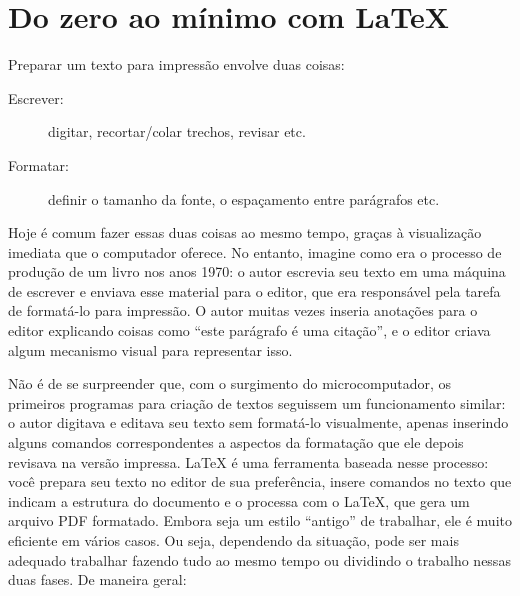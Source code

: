 
\newcommand{\sla}{\textbackslash}

\newcommand{\cmd}[1]{\textsf{#1}}

\newcommand{\pkg}[1]{\textsf{#1}}

\newcommand{\ltxcmd}[1]{\cmd{\sla{}#1}}

\chapter{Do zero ao mínimo com \LaTeX{}}
\label{chap:tutorial}

Preparar um texto para impressão envolve duas coisas:

\begin{description}
\item[Escrever:] digitar, recortar/colar trechos, revisar etc.
\item[Formatar:] definir o tamanho da fonte, o
espaçamento entre parágrafos etc.
\end{description}

Hoje é comum fazer essas duas coisas ao mesmo tempo, graças à visualização
imediata que o computador oferece. No entanto, imagine como era o processo de
produção de um livro nos anos 1970: o autor escrevia seu texto em uma máquina
de escrever e enviava esse material para o editor, que era responsável pela
tarefa de formatá-lo para impressão. O autor muitas vezes inseria anotações
para o editor explicando coisas como ``este parágrafo é uma citação'', e o
editor criava algum mecanismo visual para representar isso.

Não é de se surpreender que, com o surgimento do microcomputador, os primeiros
programas para criação de textos seguissem um funcionamento similar: o autor
digitava e editava seu texto sem formatá-lo visualmente, apenas inserindo
alguns comandos correspondentes a aspectos da formatação que ele depois
revisava na versão impressa. \LaTeX{} é uma ferramenta baseada nesse processo:
você prepara seu texto no editor de sua preferência, insere comandos no texto
que indicam a estrutura do documento e o processa com o \LaTeX{}, que gera um
arquivo PDF formatado. Embora seja um estilo ``antigo'' de trabalhar, ele é
muito eficiente em vários casos. Ou seja, dependendo da situação, pode ser
mais adequado trabalhar fazendo tudo ao mesmo tempo ou dividindo o trabalho
nessas duas fases. De maneira geral:

